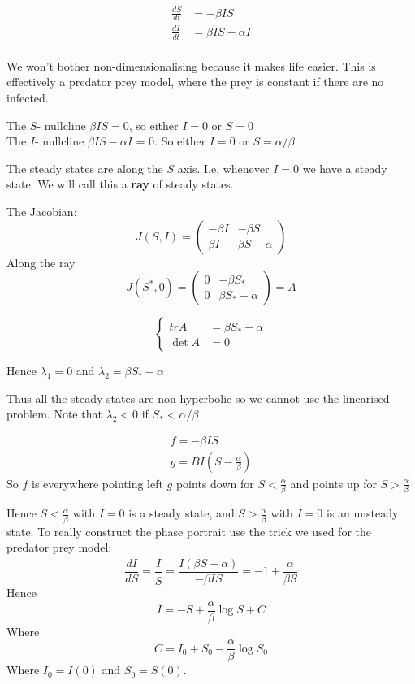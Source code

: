 \documentclass{/home/janmebows/Documents/LatexTemplates/myassignment}
\begin{document}
\begin{align*}
    \frac{dS}{dt} &=-\beta IS\\
    \frac{dI}{dt} &=\beta IS - \alpha I \\
\end{align*}

We won't bother non-dimensionalising because it makes life easier. This is effectively a predator prey model, where the prey is constant if there are no infected.


The $S$- nullcline $\beta IS = 0$, so either $I=0$ or $S=0$\\
The $I$- nullcline $\beta IS - \alpha I$ = 0. So either $I=0$ or $S = \alpha/\beta$


The steady states are along the $S$ axis. I.e. whenever $I=0$ we have a steady state. We will call this a \textbf{ray} of steady states.


The Jacobian:
\[J(S,I) = \begin{pmatrix}
    -\beta I & -\beta S\\ \beta I & \beta S - \alpha
\end{pmatrix}\]
Along the ray 
\[J(S^*,0) = \begin{pmatrix}
    0& -\beta S_*\\
    0 & \beta S_* - \alpha
\end{pmatrix} = A\]

\[\begin{cases}
    trA &= \beta S_* - \alpha\\
    \det A &= 0
\end{cases}\]

Hence $\lambda_1 = 0$ and $\lambda_2 = \beta S_* - \alpha$

Thus all the steady states are non-hyperbolic so we cannot use the linearised problem.
Note that $\lambda_2 < 0 $ if $S_* < \alpha/\beta$

\begin{align*}
    f=  -\beta IS\\
    g = BI(S-\frac{\alpha}\beta)
\end{align*}
So $f$ is everywhere pointing left
$g$ points down for $S < \frac \alpha \beta$ and points up for $S > \frac \alpha \beta$

Hence $S < \frac \alpha \beta$ with $I=0$ is a steady state, and $S > \frac \alpha \beta$ with $I=0$ is an unsteady state.
To really construct the phase portrait use the trick we used for the predator prey model:
\[\frac{dI}{dS} = \frac{\dot{I}}{\dot{S}} = \frac{I(\beta S - \alpha)}{-\beta IS} = -1 + \frac{\alpha}{\beta S}\]
Hence
\[I = -S + \frac{\alpha}\beta \log S + C\]
Where
\[C = I_0 + S_0 - \frac{\alpha}\beta \log S_0\]
Where $I_0 = I(0)$ and $S_0 = S(0)$. 
\end{document}
